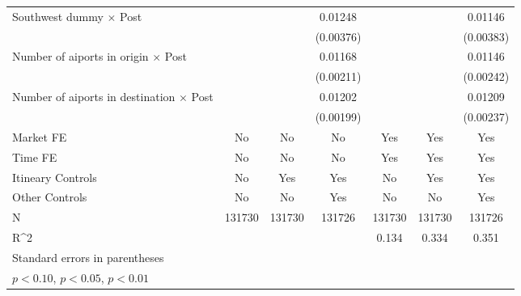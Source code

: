 \begin{table}[htbp]
\begin{tabular}{l*{6}{c}}
\addlinespace
Southwest dummy $\times$ Post&                     &                     &     0.01248\sym{***}&                     &                     &     0.01146\sym{***}\\
                    &                     &                     &   (0.00376)         &                     &                     &   (0.00383)         \\
\addlinespace
Number of aiports in origin $\times$ Post&                     &                     &     0.01168\sym{***}&                     &                     &     0.01146\sym{***}\\
                    &                     &                     &   (0.00211)         &                     &                     &   (0.00242)         \\
\addlinespace
Number of aiports in destination $\times$ Post&                     &                     &     0.01202\sym{***}&                     &                     &     0.01209\sym{***}\\
                    &                     &                     &   (0.00199)         &                     &                     &   (0.00237)         \\
\midrule
Market FE           &          No         &          No         &          No         &         Yes         &         Yes         &         Yes         \\
Time FE             &          No         &          No         &          No         &         Yes         &         Yes         &         Yes         \\
Itineary Controls   &          No         &         Yes         &         Yes         &          No         &         Yes         &         Yes         \\
Other Controls      &          No         &          No         &         Yes         &          No         &          No         &         Yes         \\
N                   &      131730         &      131730         &      131726         &      131730         &      131730         &      131726         \\
R^2                 &                     &                     &                     &       0.134         &       0.334         &       0.351         \\
\bottomrule
\multicolumn{7}{l}{\footnotesize Standard errors in parentheses}\\
\multicolumn{7}{l}{\footnotesize \sym{*} \(p<0.10\), \sym{**} \(p<0.05\), \sym{***} \(p<0.01\)}\\
\end{tabular}
\end{table}
